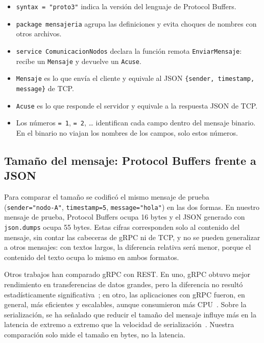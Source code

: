 \begin{itemize}
  \item \texttt{syntax = "proto3"} indica la versión del lenguaje de
        Protocol Buffers.
  \item \texttt{package mensajeria} agrupa las definiciones y evita choques
        de nombres con otros archivos.
  \item \texttt{service ComunicacionNodos} declara la función remota
        \texttt{EnviarMensaje}: recibe un \texttt{Mensaje} y devuelve un
        \texttt{Acuse}.
  \item \texttt{Mensaje} es lo que envía el cliente y equivale al JSON
        \texttt{\{sender, timestamp, message\}} de TCP.
  \item \texttt{Acuse} es lo que responde el servidor y equivale a la
        respuesta JSON de TCP.
  \item Los números \texttt{= 1}, \texttt{= 2}, \dots{} identifican cada campo
        dentro del mensaje binario. En el binario no viajan los nombres de los
        campos, solo estos números.
\end{itemize}

\subsection{Tamaño del mensaje: Protocol Buffers frente a JSON}

Para comparar el tamaño se codificó el mismo mensaje de prueba
(\texttt{sender="nodo-A"}, \texttt{timestamp=5}, \texttt{message="hola"}) en
las dos formas. En nuestro mensaje de prueba, Protocol Buffers ocupa 16 bytes
y el JSON generado con \texttt{json.dumps} ocupa 55 bytes. Estas cifras
corresponden solo al contenido del mensaje, sin contar las cabeceras de gRPC ni
de TCP, y no se pueden generalizar a otros mensajes: con textos largos, la
diferencia relativa será menor, porque el contenido del texto ocupa lo mismo
en ambos formatos.

Otros trabajos han comparado gRPC con REST. En uno, gRPC obtuvo mejor
rendimiento en transferencias de datos grandes, pero la diferencia no resultó
estadísticamente significativa~\cite{ain2025}; en otro, las aplicaciones con
gRPC fueron, en general, más eficientes y escalables, aunque consumieron más
CPU~\cite{jcsi2024}. Sobre la serialización, se ha señalado que reducir el
tamaño del mensaje influye más en la latencia de extremo a extremo que la
velocidad de serialización~\cite{maltsev2024}. Nuestra comparación solo mide
el tamaño en bytes, no la latencia.

